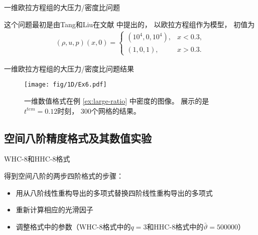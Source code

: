 \documentclass[aspectratio=169]{beamer}
\begin{document}
\begin{frame}{一维欧拉方程组的大压力/密度比问题}
  
  \begin{example}
    \label{ex:large-ratio}
    这个问题最初是由Tang和Liu在文献 \citep{LPDRP} 中提出的，
    以欧拉方程组作为模型，
    初值为
    \begin{equation*}
      \begin{aligned}
        (\rho, u, p)(x,0)=
        \begin{cases}
          (10^4,0,10^4), & x<0.3,  \\
          (1,0,1),       & x>0.3.
        \end{cases}
      \end{aligned}
    \end{equation*}
  \end{example}
  
\end{frame}

\begin{frame}{一维欧拉方程组的大压力/密度比问题结果}
  
  \begin{figure}[htbp]
    \centering
    \texttt{[image: fig/1D/Ex6.pdf]}
    \caption{一维数值格式在例 \ref{ex:large-ratio} 中密度的图像。
      展示的是$t^{tem} = 0.12$时刻，
      $300$个网格的结果。
    }
    \label{fig:6_1}
  \end{figure}
  
\end{frame}

\subsection{空间八阶精度格式及其数值实验}

\begin{frame}{WHC-8和HHC-8格式}
  
  得到空间八阶的两步四阶格式的步骤：
  
  \begin{itemize}[<+->]
    \item 用从八阶线性重构导出的多项式替换四阶线性重构导出的多项式
    \item 重新计算相应的光滑因子
    \item 调整格式中的参数（WHC-8格式中的$q=3$和HHC-8格式中的$\bar\vartheta=500000$）
  \end{itemize}
  
\end{frame}
\end{document}
